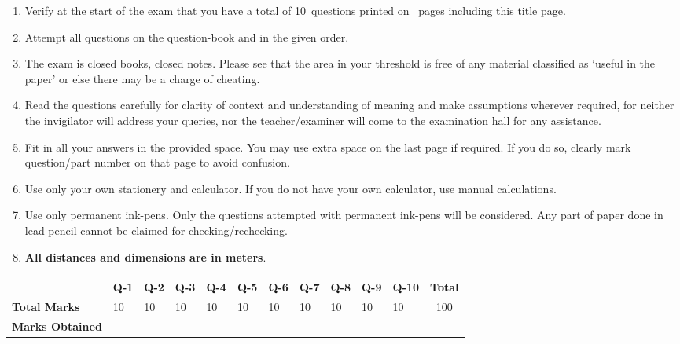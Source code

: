 \documentclass[12pt,a4paper]{article}
\newcommand\TotalMarks{100}
\newcommand\TotalQuestions{10}
\newcommand\TotalPages{\pageref{LastPage}} %
\def\Qone{10}
\def\Qtwo{10}
\def\Qthree{10}
\def\Qfour{10}
\def\Qfive{10}
\def\Qsix{10}
\def\Qseven{10}
\def\Qeight{10}
\def\Qnine{10}
\def\Qten{10}
\begin{document}
\begin{enumerate}
\itemsep0em
\item Verify at the start of the exam that you have a total of \TotalQuestions~questions printed on \TotalPages~pages including this title page.
\item Attempt all questions on the question-book and in the given order.
\item The exam is closed books, closed notes. Please see that the area in your threshold is free of any material classified as `useful in the paper' or else there may be a charge of cheating.
\item Read the questions carefully for clarity of context and understanding of meaning and make assumptions wherever required, for neither the invigilator will address your queries, nor the teacher/examiner will come to the examination hall for any assistance.
\item Fit in all your answers in the provided space. You may use extra space on the last page if required. If you do so, clearly mark question/part number on that page to avoid confusion. 
\item Use only your own stationery and calculator. If you do not have your own calculator, use manual calculations. 
\item Use only permanent ink-pens. Only the questions attempted with permanent ink-pens will be considered. Any part of paper done in lead pencil cannot be claimed for checking/rechecking.
\item \textbf{All distances and dimensions are in meters}.
\end{enumerate}
\begin{table}[H]
\begin{center}
\vspace{0.3cm}
	{\footnotesize \begin{tabular}{|C{1.8cm}|C{0.75cm}|C{0.75cm}|C{0.75cm}|C{0.75cm}|C{0.75cm}|C{0.75cm}|C{0.75cm}|C{0.75cm}|C{0.75cm}|C{0.75cm}|c|}
	\hline
		\rule{0pt}{4.6ex} & Q-1 & Q-2 & Q-3 & Q-4 & Q-5 & Q-6 & Q-7 & Q-8 & Q-9 & Q-10 &\textbf{Total}\\[-0.5ex]
		\hline
		\rule{0pt}{2.5ex}\textbf{Total Marks}& \Qone & \Qtwo & \Qthree & \Qfour & \Qfive & \Qsix & \Qseven & \Qeight & \Qnine & \Qten & \TotalMarks\\
		\hline
		\rule{0pt}{2.5ex}\textbf{Marks Obtained}& & & & & & & & & & &\\
	\hline
	\end{tabular}}
\end{center}
\end{table}
\end{document}
